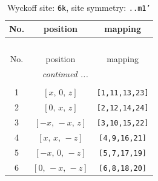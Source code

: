 \documentclass[fleqn,8pt]{jsarticle}
\begin{document}
\renewcommand{\arraystretch}{1.2}
\begin{longtable}{ccc}
\caption{Wyckoff site: {\tt 6k}, site symmetry: {\tt ..m1'}}
 \\
 \hline \hline
No. & position & mapping \\ \hline \endfirsthead

\multicolumn{2}{l}{\tablename\ \thetable{}} \\
 \hline \hline
No. & position & mapping \\ \hline \endhead

 \hline \hline
\multicolumn{2}{r}{\footnotesize\it continued ...} \\ \endfoot

 \hline \hline
\multicolumn{2}{r}{} \\ \endlastfoot

1 & $\left[ x,\, 0,\, z \right]$ & {\tt [1,11,13,23]} \\ \hline
2 & $\left[ 0,\, x,\, z \right]$ & {\tt [2,12,14,24]} \\ \hline
3 & $\left[ - x,\, - x,\, z \right]$ & {\tt [3,10,15,22]} \\ \hline
4 & $\left[ x,\, x,\, - z \right]$ & {\tt [4,9,16,21]} \\ \hline
5 & $\left[ - x,\, 0,\, - z \right]$ & {\tt [5,7,17,19]} \\ \hline
6 & $\left[ 0,\, - x,\, - z \right]$ & {\tt [6,8,18,20]} \\
\end{longtable}
\renewcommand{\arraystretch}{1.2}
\end{document}
